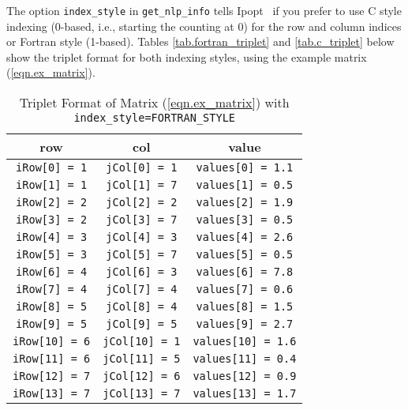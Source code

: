 \documentclass[10pt]{article}
\newcommand{\Ipopt}{{\sc Ipopt }}
\begin{document}
The option {\tt index\_style} in {\tt get\_nlp\_info} tells \Ipopt\ if
you prefer to use C style indexing (0-based, i.e., starting the
counting at 0) for the row and column indices or Fortran style
(1-based). Tables \ref{tab.fortran_triplet} and \ref{tab.c_triplet}
below show the triplet format for both indexing styles, using the
example matrix (\ref{eqn.ex_matrix}).

\begin{footnotesize}
\begin{table}[ht]%
\begin{center}
\begin{tabular}{c c c}
row     		&       col     	&       value 			    \\
\hline
{\tt iRow[0] = 1}       &       {\tt jCol[0] = 1}       & {\tt values[0] = 1.1}     \\
{\tt iRow[1] = 1}       &       {\tt jCol[1] = 7}       & {\tt values[1] = 0.5}     \\
{\tt iRow[2] = 2}       &       {\tt jCol[2] = 2}       & {\tt values[2] = 1.9}     \\
{\tt iRow[3] = 2}       &       {\tt jCol[3] = 7}       & {\tt values[3] = 0.5}     \\
{\tt iRow[4] = 3}       &       {\tt jCol[4] = 3}       & {\tt values[4] = 2.6}     \\
{\tt iRow[5] = 3}       &       {\tt jCol[5] = 7}       & {\tt values[5] = 0.5}     \\
{\tt iRow[6] = 4}       &       {\tt jCol[6] = 3}       & {\tt values[6] = 7.8}     \\
{\tt iRow[7] = 4}       &       {\tt jCol[7] = 4}       & {\tt values[7] = 0.6}     \\
{\tt iRow[8] = 5}       &       {\tt jCol[8] = 4}       & {\tt values[8] = 1.5}     \\
{\tt iRow[9] = 5}       &       {\tt jCol[9] = 5}       & {\tt values[9] = 2.7}     \\
{\tt iRow[10] = 6}      &       {\tt jCol[10] = 1}      & {\tt values[10] = 1.6}     \\
{\tt iRow[11] = 6}      &       {\tt jCol[11] = 5}      & {\tt values[11] = 0.4}     \\
{\tt iRow[12] = 7}      &       {\tt jCol[12] = 6}      & {\tt values[12] = 0.9}     \\
{\tt iRow[13] = 7}      &       {\tt jCol[13] = 7}      & {\tt values[13] = 1.7}
\end{tabular}
\caption{Triplet Format of Matrix (\ref{eqn.ex_matrix}) 
with {\tt index\_style=FORTRAN\_STYLE}}

\end{center}
\end{table}
\end{footnotesize}
\end{document}
